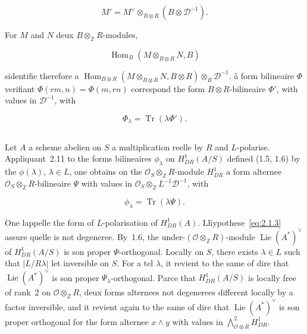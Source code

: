 \documentclass[11pt,a4paper]{article}
\theoremstyle{plain}
\theoremstyle{definition}
\DeclareMathOperator{\Hom}{Hom}
\DeclareMathOperator{\Lie}{Lie}
\DeclareMathOperator{\Tr}{Tr}
\begin{document}
\begin{equation}
M' = M^\vee \otimes_{B \otimes R} (B \otimes \mathscr{D}^{-1}).
\end{equation}

For $M$ and $N$ deux $B \otimes_{\mathbb{Z}} R$-modules,

\begin{equation}
\Hom_B(M \otimes_{B \otimes R} N, B)
\end{equation}

sidentifie therefore a $\Hom_{B \otimes R}(M \otimes_{B \otimes R} N, B \otimes R) \otimes_R \mathscr{D}^{-1}$. \`a form bilineaire
$\Phi$ verifiant $\Phi(rm, n) = \Phi(m, rn)$ correspond the form $B \otimes R$-bilineaire $\Phi'$, with values in $\mathscr{D}^{-1}$, with

\begin{equation}
\Phi_\lambda = \Tr(\lambda \Phi').
\end{equation}

\subsection{}

Let $A$ a scheme abelien on $S$ a multiplication reelle by $R$ and $L$-polarise.
Appliquant~2.11 to the forms bilineaires $\phi_\lambda$ on $H^1_{DR}(A/S)$ defined (1.5, 1.6) by
the $\phi(\lambda)$, $\lambda \in L$, one obtains on the $\mathscr{O}_S \otimes_{\mathbb{Z}} R$-module $H^1_{DR}$ a form alternee
$\mathscr{O}_S \otimes_{\mathbb{Z}} R$-bilineaire $\Psi$ with values in $\mathscr{O}_S \otimes_{\mathbb{Z}} L^{-1}\mathscr{D}^{-1}$, with

\begin{equation}
\phi_\lambda = \Tr(\lambda \Psi).
\end{equation}

One lappelle the form of $L$-polarisation of $H^1_{DR}(A)$. L\'hypothese~\eqref{eq:2.1.3}
assure quelle is not degeneree. By~1.6, the under-$(\mathscr{O} \otimes_{\mathbb{Z}} R)$-module $\Lie(A^*)^\vee$ of
$H^1_{DR}(A/S)$ is son proper $\Psi$-orthogonal. Locally on $S$, there exists $\lambda \in L$ such that
$|L/R\lambda|$ let inversible on $S$. For a tel $\lambda$, it revient to the same of dire that
$\Lie(A^*)^\vee$ is son proper $\Psi_\lambda$-orthogonal. Parce that $H^1_{DR}(A/S)$ is locally
free of rank~2 on $\mathscr{O} \otimes_{\mathbb{Z}} R$, deux forms alternees not degenerees different
locally by a factor inversible, and it revient again to the same of dire that
$\Lie(A^*)^\vee$ is son proper orthogonal for the form alternee $x \wedge y$ with values in $\bigwedge^2_{\mathscr{O} \otimes R} H^1_{DR}$.
\end{document}

